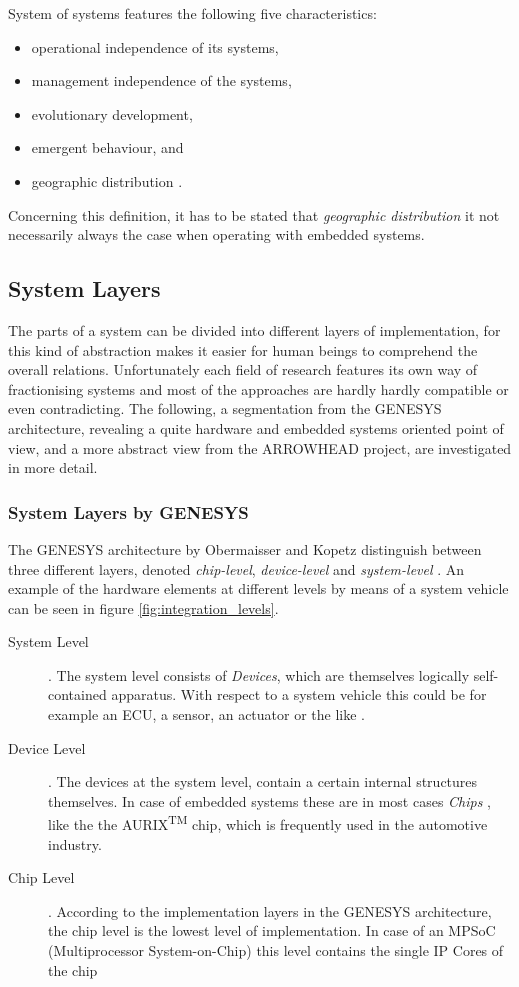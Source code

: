 System of systems features the following five characteristics:
\begin{itemize}
\item operational independence of its systems,
\item management independence of the systems,
\item evolutionary development,
\item emergent behaviour, and
\item geographic distribution \cite{arrowhead_inpr}.
\end{itemize}
Concerning this definition, it has to be stated that \emph{geographic distribution} it not necessarily always the case when operating with embedded systems.


\subsection{System Layers}
\label{ch:system_layers}
The parts of a system can be divided into different layers of implementation, for this kind of abstraction makes it easier for human beings to comprehend the overall relations. Unfortunately each field of research features its own way of fractionising systems and most of the approaches are hardly hardly compatible or even contradicting. The following, a segmentation from the GENESYS architecture, revealing a quite hardware and embedded systems oriented point of view, and a more abstract view from the ARROWHEAD project, are investigated in more detail.

\subsubsection{System Layers by GENESYS}
The GENESYS architecture by Obermaisser and Kopetz distinguish between three different layers, denoted \emph{chip-level}, \emph{device-level} and \emph{system-level} \cite[p.44]{genesys}. An example of the hardware elements at different levels by means of a system vehicle can be seen in figure \ref{fig:integration_levels}.
\begin{description}
\item [System Level] .
The system level consists of \emph{Devices}, which are themselves logically self-contained apparatus. With respect to a system vehicle this could be for example an ECU, a sensor, an actuator or the like \cite[p.45]{genesys}.
\item [Device Level] .
The devices at the system level, contain a certain internal structures themselves. In case of embedded systems these are in most cases \emph{Chips} \cite[p.45]{genesys}, like the the AURIX\textsuperscript{TM} chip, which is frequently used in the automotive industry.
\item [Chip Level] .
According to the implementation layers in the GENESYS architecture, the chip level is the lowest level of implementation. In case of an MPSoC (Multiprocessor System-on-Chip) this level contains the single IP Cores of the chip \cite[p.46]{genesys}
\end{description}

